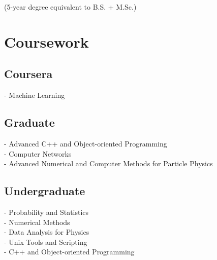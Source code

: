 \documentclass[letterpaper]{deedy-resume} %
\begin{document}
\begin{minipage}[t]{0.29\textwidth}
\small{(5-year degree equivalent to B.S. + M.Sc.)}\\

\sectionspace %
\sectionspace %


\section{Coursework}

\subsection{Coursera}
- Machine Learning \\

\sectionspace %


\subsection{Graduate}
- Advanced C++ and Object-oriented Programming \\
- Computer Networks \\ 
- Advanced Numerical and Computer Methods for Particle Physics \\

\sectionspace %


\subsection{Undergraduate}

- Probability and Statistics \\
- Numerical Methods \\
- Data Analysis for Physics \\
- Unix Tools and Scripting \\
- C++ and Object-oriented Programming \\



\end{minipage} %
\end{document}

